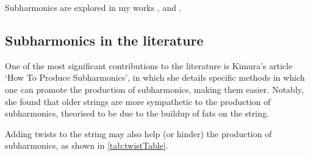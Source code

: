 Subharmonics are explored in my works , and .


\subsection{Subharmonics in the literature}

One of the most significant contributions to the literature is Kimura's article `How To Produce Subharmonics', in which she details specific methods in which one can promote the production of subharmonics, making them easier.\autocite[]{kimuraHowProduceSubharmonics1999}
Notably, she found that older strings are more sympathetic to the production of subharmonics, theorised to be due to the buildup of fats on the string.

Adding twists to the string may also help (or hinder) the production of subharmonics, as shown in \autoref{tab:twistTable}.\autocite[]{kimuraHowProduceSubharmonics1999}

